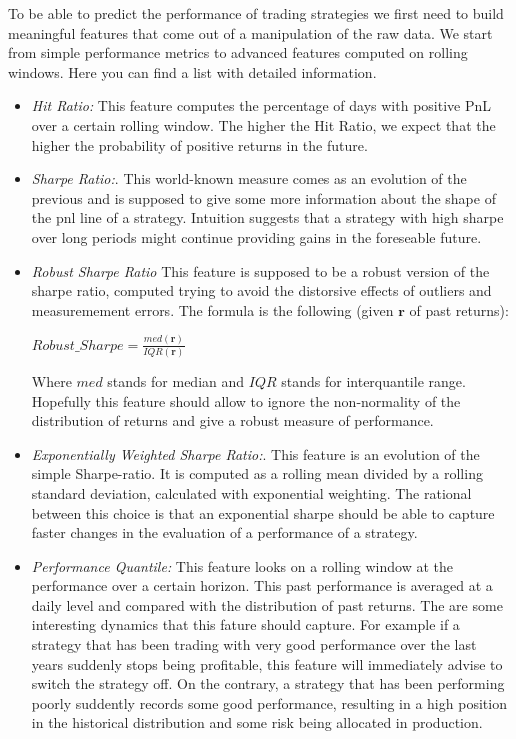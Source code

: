 To be able to predict the performance of trading strategies we first need to build meaningful features that come out of a manipulation of the raw data. We start from simple performance metrics to advanced features computed on rolling windows. Here you can find a list with detailed information.

\begin{itemize} 
	\item \textit{Hit Ratio:} This feature computes the percentage of days with positive PnL over a certain rolling window. The higher the Hit Ratio, we expect that the higher the probability of positive returns in the future.\\ 
	
	\item \textit{Sharpe Ratio:}. This world-known measure comes as an evolution of the previous and is supposed to give some more information about the shape of the pnl line of a strategy. Intuition suggests that a strategy with high sharpe over long periods might continue providing gains in the foreseable future.\\
	
	\item \textit{Robust Sharpe Ratio} This feature is supposed to be a robust version of the sharpe ratio, computed trying to avoid the distorsive effects of outliers and measuremement errors. The formula is the following (given $\mathbf{r}$ of past returns):
	
		\begin{center} 
			$\displaystyle Robust\_Sharpe =  \frac{med(\mathbf{r})}{IQR(\mathbf{r})}$
		\end{center}
		
	Where $med$ stands for median and $IQR$ stands for interquantile range. Hopefully this feature should allow to ignore the non-normality of the distribution of returns and give a robust measure of performance.\\
	
	\item \textit{Exponentially Weighted Sharpe Ratio:}. This feature is an evolution of the simple Sharpe-ratio. It is computed as a rolling mean divided by a rolling standard deviation, calculated with exponential weighting. The rational between this choice is that an exponential sharpe should be able to capture faster changes in the evaluation of a performance of a strategy.\\
	
	  
	\item \textit{Performance Quantile:} This feature looks on a rolling window at the performance over a certain horizon. This past performance is averaged at a daily level and compared with the distribution of past returns. The are some interesting dynamics that this fature should capture. For example if a strategy that has been trading with very good performance over the last years suddenly stops being profitable, this feature will immediately advise to switch the strategy off. On the contrary, a strategy that has been performing poorly suddently records some good performance, resulting in a high position in the historical distribution and some risk being allocated in production.\\   


\end{itemize}
